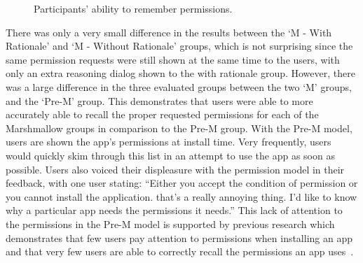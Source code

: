 \documentclass{sig-alternate-05-2015}
\begin{document}
\begin{figure}[!htb]
\centering
{}
\caption{Participants' ability to remember permissions.}
\label{fig:remember}
\end{figure}


There was only a very small difference in the results between the `M - With Rationale' and `M - Without Rationale' groups, which is not surprising since the same permission requests were still shown at the same time to the users, with only an extra reasoning dialog shown to the with rationale group. However, there was a large difference in the three evaluated groups between the two `M' groups, and the `Pre-M' group. This demonstrates that users were able to more accurately able to recall the proper requested permissions for each of the Marshmallow groups in comparison to the Pre-M group. With the Pre-M model, users are shown the app's permissions at install time. Very frequently, users would quickly skim through this list in an attempt to use the app as soon as possible. Users also voiced their displeasure with the permission model in their feedback, with one user stating: ``Either you accept the condition of permission or you cannot install the application. that's a really annoying thing. I'd like to know why a particular app needs the permissions it needs.'' This lack of attention to the permissions in the Pre-M model is supported by previous research which demonstrates that few users pay attention to permissions when installing an app and that very few users are able to correctly recall the permissions an app uses~\cite{Felt:2012:APU:2335356.2335360}.
\end{document}
